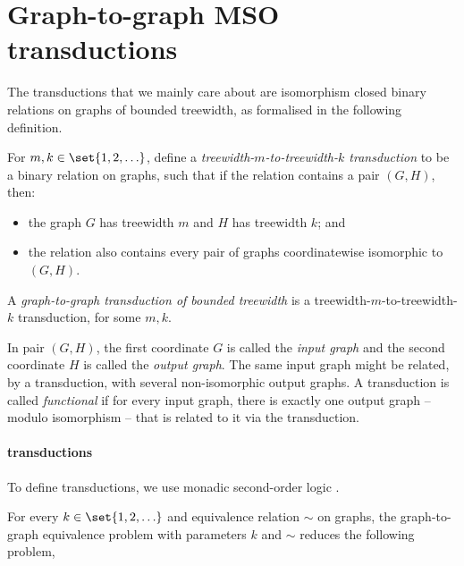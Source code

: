 \section{Graph-to-graph MSO transductions}

The transductions that we mainly care about are isomorphism closed binary relations on graphs of bounded treewidth, as formalised in the following definition.
\begin{definition}
For $m, k \in \set{1,2,\ldots}$, define a \emph{treewidth-$m$-to-treewidth-$k$ transduction} to be a binary relation on graphs, such that if the relation contains a pair $(G,H)$, then:
\begin{itemize}
    \item  the graph $G$  has treewidth $m$ and $H$ has treewidth $k$; and
    \item the relation also contains every pair of graphs  coordinatewise isomorphic to $(G,H)$.
\end{itemize}
A \emph{graph-to-graph transduction of bounded treewidth} is a treewidth-$m$-to-treewidth-$k$ transduction, for some $m,k$.
\end{definition}
In pair $(G,H)$, the first coordinate $G$ is called the \emph{input graph} and the second coordinate $H$ is called the \emph{output graph}. The same input graph might be related, by a transduction, with several non-isomorphic output graphs. A transduction is called \emph{functional} if for every input graph, there is exactly one output graph -- modulo isomorphism -- that is related to it via the transduction.
\paragraph*{\mso transductions}
To define transductions, we use monadic second-order logic \mso.



\begin{lemma}
    For every $k \in \set{1,2,\ldots}$ and equivalence relation $\sim$ on graphs, the graph-to-graph equivalence problem with parameters $k$ and $\sim$ reduces the following problem, 
    
\end{lemma}

